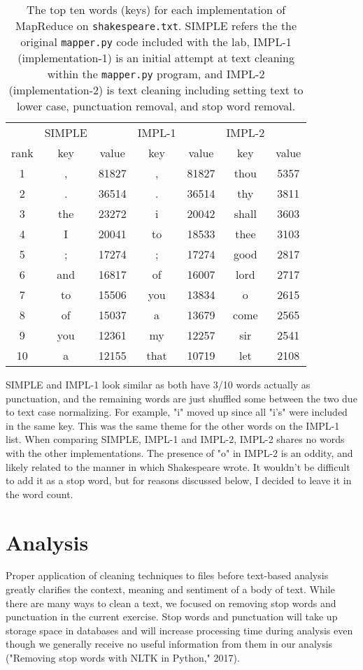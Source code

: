 \documentclass[]{article}
\newcommand{\code}[1]{\colorbox{light-gray}{\texttt{#1}}}
\begin{document}
\begin{table}[!h]
	\centering
	\begin{tabular}{| c | c  c | c  c | c  c | }
		\hline
		&SIMPLE &  & IMPL-1&  & IMPL-2 &   \\
		rank&key & value & key & value & key & value  \\
		\hline
		1&, & 81827 & , & 81827 & thou & 5357 \\
		2&. & 36514 & . & 36514 & thy & 3811 \\
		3&the & 23272 & i & 20042 & shall & 3603 \\
		4&I & 20041 & to & 18533 & thee & 3103 \\
		5&; & 17274 & ; & 17274 & good & 2817 \\
		6&and & 16817 & of & 16007 & lord & 2717 \\
		7&to & 15506 & you & 13834 & o & 2615 \\
		8&of & 15037 & a & 13679 & come & 2565 \\
		9&you & 12361 & my & 12257 & sir & 2541 \\
		10&a & 12155 & that & 10719 & let & 2108 \\
		\hline
	\end{tabular}
	\caption{The top ten words (keys) for each implementation of MapReduce on \code{shakespeare.txt}.  SIMPLE refers the the original \code{mapper.py} code included with the lab, IMPL-1 (implementation-1) is an initial attempt at text cleaning within the \code{mapper.py} program, and IMPL-2 (implementation-2) is text cleaning including setting text to lower case, punctuation removal, and stop word removal.}
\end{table}
SIMPLE and IMPL-1 look similar as both have 3/10 words actually as punctuation, and the remaining words are just shuffled some between the two due to text case normalizing.  For example, "i" moved up since all "i's" were included in the same key.  This was the same theme for the other words on the IMPL-1 list.  When comparing SIMPLE, IMPL-1 and IMPL-2, IMPL-2 shares no words with the other implementations.  The presence of "o" in IMPL-2 is an oddity, and likely related to the manner in which Shakespeare wrote.  It wouldn't be difficult to add it as a stop word, but for reasons discussed below, I decided to leave it in the word count. 
\section{Analysis}
Proper application of cleaning techniques to files before text-based analysis greatly clarifies the context, meaning and sentiment of a body of text.  While there are many ways to clean a text, we focused on removing stop words and punctuation in the current exercise.  Stop words and punctuation will take up storage space in databases and will increase processing time during analysis even though we generally receive no useful information from them in our analysis ("Removing stop words with NLTK in Python," 2017).
\end{document}
